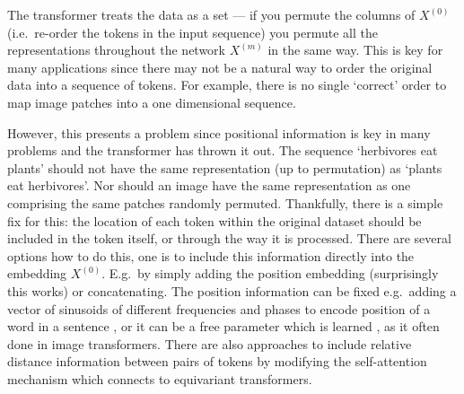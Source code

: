 \documentclass{article}
\begin{document}
The transformer treats the data as a set --- if you permute the columns of $X^{(0)}$ (i.e.~re-order the tokens in the input sequence) you permute all the representations throughout the network $X^{(m)}$ in the same way. This is key for many applications since there may not be a natural way to order the original data into a sequence of tokens. For example, there is no single ‘correct’ order to map image patches into a one dimensional sequence. 

However, this presents a problem since positional information is key in many problems and the transformer has thrown it out. The sequence ‘herbivores eat plants’ should not have the same representation (up to permutation) as ‘plants eat herbivores’. Nor should an image have the same representation as one comprising the same patches randomly permuted. Thankfully, there is a simple fix for this: the location of each token within the original dataset should be included in the token itself, or through the way it is processed. There are several options how to do this, one is to include this information directly into the embedding $X^{(0)}$. E.g.~by simply adding the position embedding (surprisingly this works) or concatenating. The position information can be fixed e.g.~adding a vector of sinusoids of different frequencies and phases to encode position of a word in a sentence \citep{NIPS2017_3f5ee243}, or it can be a free parameter which is learned \citep{devlin-etal-2019-bert}, as it often done in image transformers. There are also approaches to include relative distance information between pairs of tokens by modifying the self-attention mechanism \citep{9710917} which connects to equivariant transformers. 
\end{document}
